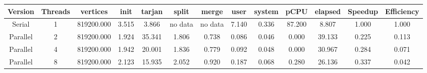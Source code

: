 \begin{tabular}{|c|c|c|c|c|c|c|c|c|c|c|c|c|}
\toprule
 Version &  Threads &   vertices &  init &  tarjan &   split &   merge &  user &  system &   pCPU &  elapsed &  Speedup &  Efficiency \\
\midrule
  Serial &        1 & 819200.000 & 3.515 &   3.866 & no data & no data & 7.140 &   0.336 & 87.200 &    8.807 &    1.000 &       1.000 \\
Parallel &        2 & 819200.000 & 1.924 &  35.341 &   1.806 &   0.738 & 0.086 &   0.046 &  0.000 &   39.133 &    0.225 &       0.113 \\
Parallel &        4 & 819200.000 & 1.942 &  20.001 &   1.836 &   0.779 & 0.092 &   0.048 &  0.000 &   30.967 &    0.284 &       0.071 \\
Parallel &        8 & 819200.000 & 2.123 &  15.935 &   2.052 &   0.920 & 0.187 &   0.068 &  0.280 &   26.136 &    0.337 &       0.042 \\
\bottomrule
\end{tabular}
